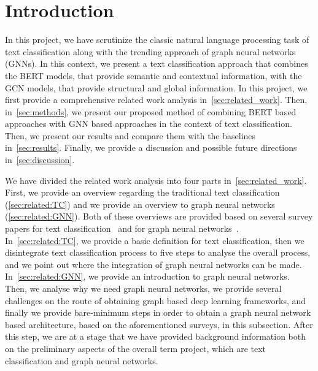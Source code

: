 \section{Introduction}
In this project, we have scrutinize the classic natural language processing task of text classification along with the trending approach of graph neural networks (GNNs). In this context, we present a text classification approach that combines the BERT models, that provide semantic and contextual information, with the GCN models, that provide structural and global information. In this project, we first provide a comprehensive related work analysis in~\cref{sec:related_work}. Then, in~\cref{sec:methods}, we present our proposed method of combining BERT based approaches with GNN based approaches in the context of text classification. Then, we present our results and compare them with the baselines in~\cref{sec:results}. Finally, we provide a discussion and possible future directions in~\cref{sec:discussion}.

We have divided the related work analysis into four parts in~\cref{sec:related_work}. First, we provide an overview regarding the traditional text classification (\cref{sec:related:TC}) and we provide an overview to graph neural networks (\cref{sec:related:GNN}). Both of these overviews are provided based on several survey papers for text classification~\autocite{kowsari19tc,li20tc,minaee20tc} and for graph neural networks~\autocite{zhou20gnn,wu21gnn,zhang18dlongraphs,sun18adversarial}. In~\cref{sec:related:TC}, we provide a basic definition for text classification, then we disintegrate text classification process to five steps to analyse the overall process, and we point out where the integration of graph neural networks can be made. In~\cref{sec:related:GNN}, we provide an introduction to graph neural networks. Then, we analyse why we need graph neural networks, we provide several challenges on the route of obtaining graph based deep learning frameworks, and finally we provide bare-minimum steps in order to obtain a graph neural network based architecture, based on the aforementioned surveys, in this subsection. After this step, we are at a stage that we have provided background information both on the preliminary aspects of the overall term project, which are text classification and graph neural networks. 

